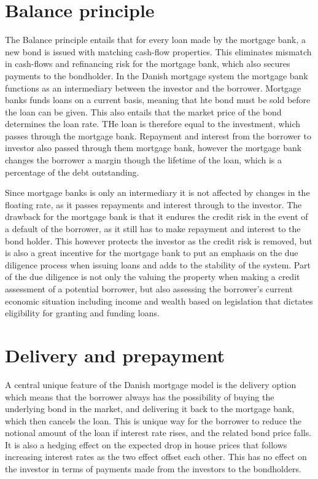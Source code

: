 \documentclass[12pt,twoside]{reedthesis}
\begin{document}
\hypertarget{balance}{%
\section{Balance principle}\label{balance}}

The Balance principle entails that for every loan made by the mortgage bank, a new bond is issued with matching cash-flow properties. This eliminates mismatch in cash-flows and refinancing risk for the mortgage bank, which also secures payments to the bondholder. In the Danish mortgage system the mortgage bank functions as an intermediary between the investor and the borrower. Mortgage banks funds loans on a current basis, meaning that hte bond must be sold before the loan can be given. This also entails that the market price of the bond determines the loan rate. THe loan is therefore equal to the investment, which passes through the mortgage bank. Repayment and interest from the borrower to investor also passed through them mortgage bank, however the mortgage bank changes the borrower a margin though the lifetime of the loan, which is a percentage of the debt outstanding.

Since mortgage banks is only an intermediary it is not affected by changes in the floating rate, as it passes repayments and interest through to the investor. The drawback for the mortgage bank is that it endures the credit risk in the event of a default of the borrower, as it still has to make repayment and interest to the bond holder. This however protects the investor as the credit risk is removed, but is also a great incentive for the mortgage bank to put an emphasis on the due diligence process when issuing loans and adds to the stability of the system. Part of the due diligence is not only the valuing the property when making a credit assessment of a potential borrower, but also assessing the borrower's current economic situation including income and wealth based on legislation that dictates eligibility for granting and funding loans.

\hypertarget{delivery-and-prepayment}{%
\section{Delivery and prepayment}\label{delivery-and-prepayment}}

A central unique feature of the Danish mortgage model is the delivery option which means that the borrower always has the possibility of buying the underlying bond in the market, and delivering it back to the mortgage bank, which then cancels the loan. This is unique way for the borrower to reduce the notional amount of the loan if interest rate rises, and the related bond price falls. It is also a hedging effect on the expected drop in house prices that follows increasing interest rates as the two effect offset each other. This has no effect on the investor in terms of payments made from the investors to the bondholders.
\end{document}
